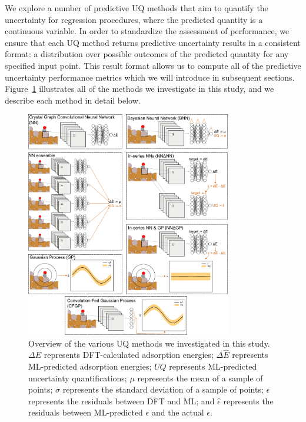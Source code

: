 \documentclass[]{achemso}
\begin{document}
We explore a number of predictive \gls{UQ} methods that aim to quantify the uncertainty for regression procedures, where the predicted quantity is a continuous variable.
In order to standardize the assessment of performance, we ensure that each \gls{UQ} method returns predictive uncertainty results in a consistent format:  a distribution over possible outcomes of the predicted quantity for any specified input point.
This result format allows us to compute all of the predictive uncertainty performance metrics which we will introduce in subsequent sections.
Figure~\ref{fig:methods} illustrates all of the methods we investigate in this study, and we describe each method in detail below.

\begin{figure}
    \centering
    \includegraphics[width=0.8\textwidth]{methods/methods.pdf}
    \caption{Overview of the various \gls{UQ} methods we investigated in this study.
    $\Delta E$ represents \gls{DFT}-calculated adsorption energies;
    $\Delta \hat{E}$ represents \gls{ML}-predicted adsorption energies;
    $UQ$ represents \gls{ML}-predicted uncertainty quantifications;
    $\mu$ represents the mean of a sample of points;
    $\sigma$ represents the standard deviation of a sample of points;
    $\epsilon$ represents the residuals between \gls{DFT} and \gls{ML};
    and $\hat{\epsilon}$ represents the residuals between \gls{ML}-predicted $\epsilon$ and the actual $\epsilon$.
    }\label{fig:methods}
\end{figure}
\end{document}
